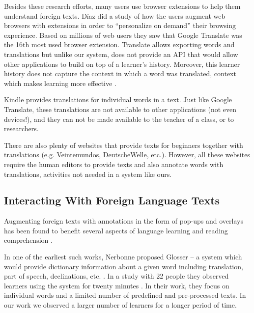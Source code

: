 
Besides these research efforts, many users use browser extensions to help them understand foreign texts. D\'iaz \cite{Diaz15-Augmented} did a study of how the users augment web browsers with extensions in order to ``personalize on demand'' their browsing experience. Based on millions of web users they saw that Google Translate was the 16th most used browser extension. 
Translate allows exporting words and translations but unlike our system, does not provide an API that would allow other applications to build on top of a learner's history. Moreover, this learner history does not capture the context in which a word was translated, context which makes learning more effective \cite{nagy95-context}. 

Kindle provides translations for individual words in a text. Just like Google Translate, these translations are not available to other applications (not even devices!), and they can not be made available to the teacher of a class, or to researchers. 

There are also plenty of websites that provide texts for beginners together with translations (e.g. Veintemundos, DeutscheWelle, etc.). However, all these websites require the human editors to provide texts and also annotate words with translations, activities not needed in a system like ours. 


\subsection{Interacting With Foreign Language Texts}

Augmenting foreign texts with annotations in the form of pop-ups and overlays has been found to benefit several aspects of language learning \cite{DeRidder02-Links} and reading comprehension \cite{Sanko06-Effects}.



	In one of the earliest such works, Nerbonne proposed Glosser -- a system which would provide dictionary information about a given word including translation, part of speech, declinations, etc. \cite{Nerb99-Assistant}.
	In a study with 22 people they observed learners using the system for twenty minutes \cite{Dokter98-UserStudy}. 
	In their work, they focus on individual words and a limited number of predefined and pre-processed texts. 
	In our work we observed a larger number of learners for a longer period of time.


